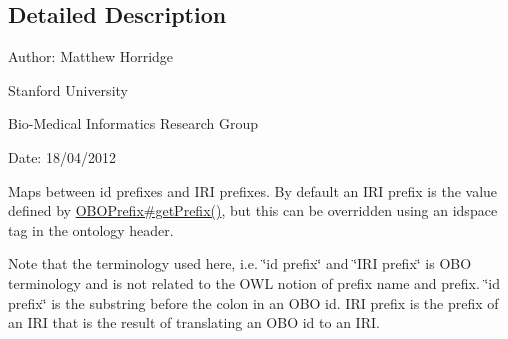\subsection{Detailed Description}
Author\-: Matthew Horridge\par
 Stanford University\par
 Bio-\/\-Medical Informatics Research Group\par
 Date\-: 18/04/2012 

Maps between id prefixes and I\-R\-I prefixes. By default an I\-R\-I prefix is the value defined by \hyperlink{enumorg_1_1coode_1_1owlapi_1_1obo_1_1parser_1_1_o_b_o_prefix_acdcb908b27fe98e31c8d2cb05d898fce}{O\-B\-O\-Prefix\#get\-Prefix()}, but this can be overridden using an idspace tag in the ontology header. 

Note that the terminology used here, i.\-e. \char`\"{}id prefix\char`\"{} and \char`\"{}\-I\-R\-I prefix\char`\"{} is O\-B\-O terminology and is not related to the O\-W\-L notion of prefix name and prefix. \char`\"{}id prefix\char`\"{} is the substring before the colon in an O\-B\-O id. I\-R\-I prefix is the prefix of an I\-R\-I that is the result of translating an O\-B\-O id to an I\-R\-I. 

